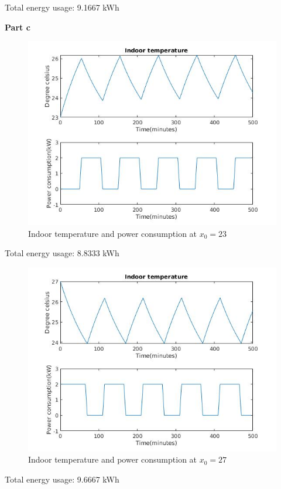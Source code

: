 \documentclass[11pt]{article}
\begin{document}
Total energy usage: 9.1667 kWh

\noindent
\textbf{Part c} \\
\begin{figure}[H]
    \centering
    \includegraphics[scale=0.6]{figs/q5_c1.jpg}
    \caption{Indoor temperature and power consumption at $x_0 = 23$ }
    \label{fig::q5c1}
\end{figure}

Total energy usage: 8.8333 kWh

\begin{figure}[H]
    \centering
    \includegraphics[scale=0.6]{figs/q5_c2.jpg}
    \caption{Indoor temperature and power consumption at $x_0 = 27$ }
    \label{fig::q5c2}
\end{figure}

Total energy usage: 9.6667 kWh
\end{document}
